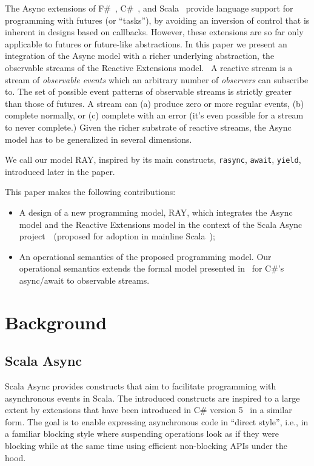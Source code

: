 \documentclass{acm_proc_article-sp}
\begin{document}
The Async extensions of F\#~\cite{SymePL11}, C\#~\cite{FormalizingAsync}, and
Scala~\cite{ScalaAsyncSIP} provide language support for programming with
futures (or ``tasks''), by avoiding an inversion of control that is inherent
in designs based on callbacks. However, these extensions are so far only
applicable to futures or future-like abstractions. In this paper we present
an integration of the Async model with a richer underlying abstraction, the
observable streams of the Reactive Extensions model.~\cite{RxCACM} A reactive
stream is a stream of {\em observable events} which an arbitrary number of
{\em observers} can subscribe to. The set of possible event patterns of
observable streams is strictly greater than those of futures. A stream can (a)
produce zero or more regular events, (b) complete normally, or (c) complete
with an error (it's even possible for a stream to never complete.) Given the
richer substrate of reactive streams, the Async model has to be generalized in
several dimensions.

We call our model RAY, inspired by its main constructs, \texttt{rasync},
\texttt{await}, \texttt{yield}, introduced later in the paper.

This paper makes the following contributions:
\begin{itemize}
  \item  A design of a new programming model, RAY, which integrates the Async model and the Reactive Extensions model in the context of the Scala Async project~\cite{ScalaAsync}~(proposed for adoption in mainline Scala~\cite{ScalaAsyncSIP});
  \item An operational semantics of the proposed programming model. Our operational semantics extends the
    formal model presented in~\cite{FormalizingAsync} for C\#'s async/await to observable streams.
\end{itemize}

\section{Background}

\vspace{0.2cm}
\subsection{Scala Async}\label{sec:scala-async}

Scala Async provides constructs that aim to facilitate programming with
asynchronous events in Scala. The introduced constructs are inspired to a
large extent by extensions that have been introduced in C\# version 5~\cite{Hejlsberg:2011:CPL} in a
similar form. The goal is to enable expressing
asynchronous code in ``direct style'', i.e., in a familiar blocking style
where suspending operations look as if they were blocking while at the same
time using efficient non-blocking APIs under the hood.
\end{document}
